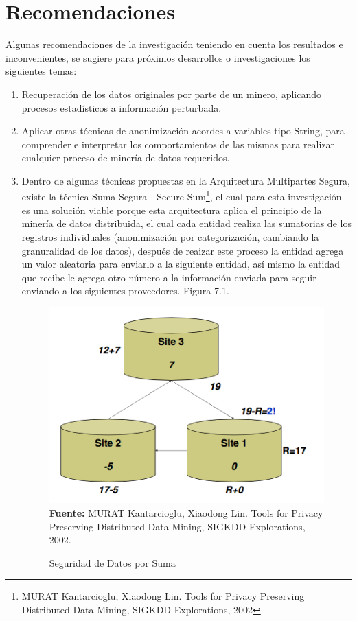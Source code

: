 \documentclass[a4paper,openright,12pt]{book}
\theoremstyle{definition}
\theoremstyle{remark}
\begin{document}
\section{Recomendaciones}
Algunas recomendaciones de la investigación teniendo en cuenta los resultados e inconvenientes, se sugiere para próximos desarrollos o investigaciones los siguientes temas:
\begin{enumerate}
	\item Recuperación de los datos originales por parte de un minero, aplicando procesos estadísticos a información perturbada.
    \item Aplicar otras técnicas de anonimización acordes a variables tipo String, para comprender e interpretar los comportamientos de las mismas para realizar cualquier proceso de minería de datos requeridos.
    \item Dentro de algunas técnicas propuestas en la Arquitectura Multipartes Segura, existe la técnica Suma Segura - Secure Sum\footnote{MURAT Kantarcioglu, Xiaodong Lin. Tools for Privacy Preserving Distributed Data Mining, SIGKDD Explorations, 2002}, el cual para esta investigación es una solución viable porque esta arquitectura aplica el principio de la minería de datos distribuida, el cual cada entidad realiza las sumatorias de los registros individuales (anonimización por categorización, cambiando la granuralidad de los datos), después de reaizar este proceso la entidad agrega un valor aleatoria para enviarlo a la siguiente entidad, así mismo la entidad que recibe le agrega otro número a la información enviada para seguir enviando a los siguientes proveedores. Figura 7.1.
\begin{figure}[h]
\centering
\caption{Seguridad de Datos por Suma} 
\includegraphics[scale=0.47]{arq2}
\label{fig:Tabla1}
\\ \textbf{Fuente: }MURAT Kantarcioglu, Xiaodong Lin. Tools for Privacy Preserving Distributed Data Mining, SIGKDD Explorations, 2002.
\end{figure}
\end{enumerate}
\clearpage
\end{document}
